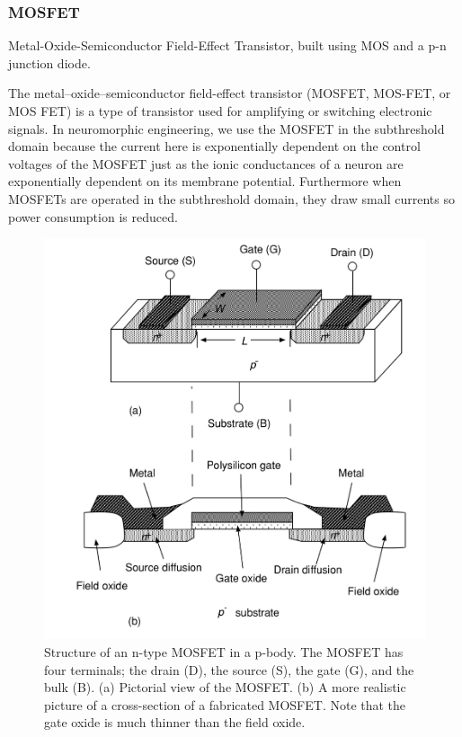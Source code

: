 \documentclass[main]{subfiles}
\begin{document}
\subsubsection{MOSFET} Metal-Oxide-Semiconductor Field-Effect Transistor, built using MOS and a p-n junction diode.

The metal–oxide–semiconductor field-effect transistor (MOSFET, MOS-FET, or MOS FET) is a type of transistor used for amplifying or switching electronic signals.
In neuromorphic engineering, we use the MOSFET in the subthreshold domain because the current here is exponentially dependent on the control voltages of the MOSFET just as the ionic conductances of a neuron are exponentially dependent on its membrane potential. Furthermore when MOSFETs are operated in the subthreshold domain, they draw small currents so power consumption is reduced.

\begin{figure}[H]
  \centering

  \includegraphics[scale=0.8]{figs/MOSFET_Structure.jpg}
  \caption{Structure of an n-type MOSFET in a p-body. The MOSFET has four terminals; the drain (D), the source (S), the gate (G), and the bulk (B). (a) Pictorial view of the MOSFET. (b) A more realistic picture of a cross-section of a fabricated MOSFET. Note that the gate oxide is much thinner than the field oxide. \cite{book:VLSI}}
  \label{fig:MOSFET_Structure}
\end{figure}\bigskip
\end{document}
